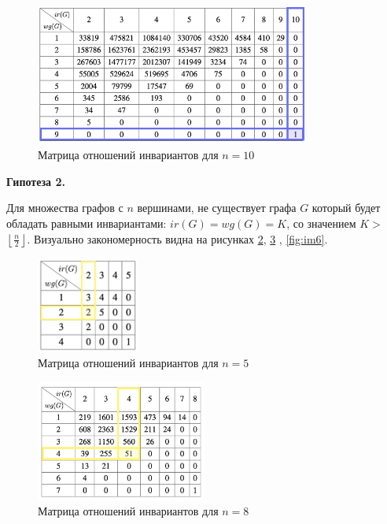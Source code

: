 \documentclass[bachelor, och, nir]{SCWorks}
\begin{document}
\begin{figure}[ht!]  
    \centering 
    \includegraphics[width=0.8\textwidth]
{Group425.png}  
    \caption{Матрица отношений инвариантов для $n = 10$} 
    \label{fig:im3} 
\end{figure}

\textbf{Гипотеза 2.} 

Для множества графов с $n$ вершинами, не существует графа $G$ который будет обладать равными инвариантами: $ir(G) = wg(G) = K$, со значением $K >$ $\left\lfloor \displaystyle \frac{n}{2} \right\rfloor$. Визуально закономерность видна на рисунках \ref{fig:im4}, \ref{fig:im5} , \ref{fig:im6}.



\begin{figure}[ht!]  
    \centering 
    \includegraphics[width=0.3\textwidth]
{Group426.png}  
    \caption{Матрица отношений инвариантов для $n = 5$} 
    \label{fig:im4} 
\end{figure}


\begin{figure}[ht!]  
    \centering 
    \includegraphics[width=0.5\textwidth]
    {Group427.png}  
    \caption{Матрица отношений инвариантов для $n = 8$} 
    \label{fig:im5} 
\end{figure}
\end{document}
